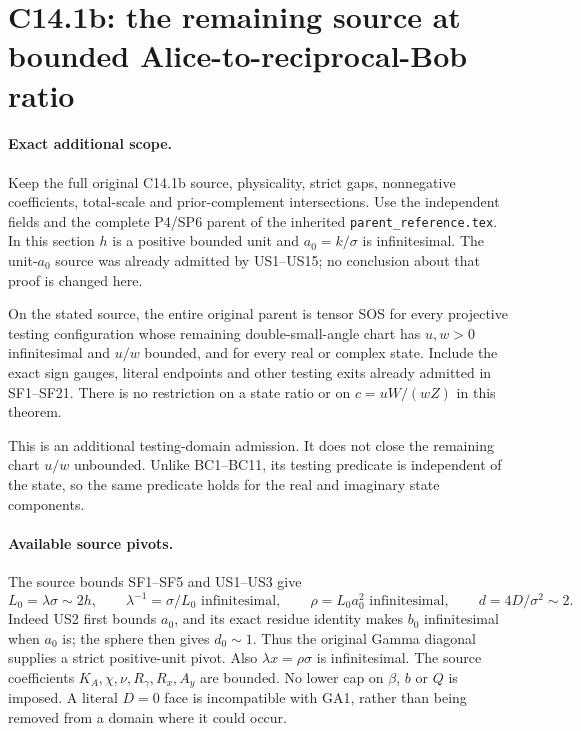 \section{C14.1b: the remaining source at bounded Alice-to-reciprocal-Bob ratio}
\label{sec:c141b-gamma-angular}

\paragraph{Exact additional scope.}
Keep the full original C14.1b source, physicality, strict gaps,
nonnegative coefficients, total-scale and prior-complement
intersections. Use the independent fields and the complete P4/SP6
parent of the inherited \texttt{parent\_reference.tex}. In this
section $h$ is a positive bounded unit and $a_0=k/\sigma$ is
infinitesimal. The unit-$a_0$ source was already admitted by
US1--US15; no conclusion about that proof is changed here.

\begin{theorem}
On the stated source, the entire original parent is tensor SOS
for every projective testing configuration whose remaining
double-small-angle chart has $u,w>0$ infinitesimal and $u/w$
bounded, and for every real or complex state. Include the exact
sign gauges, literal endpoints and other testing exits already
admitted in SF1--SF21. There is no restriction on a state ratio
or on $c=uW/(wZ)$ in this theorem.
\end{theorem}

This is an additional testing-domain admission. It does not close
the remaining chart $u/w$ unbounded. Unlike BC1--BC11, its testing
predicate is independent of the state, so the same predicate holds
for the real and imaginary state components.

\paragraph{Available source pivots.}
The source bounds SF1--SF5 and US1--US3 give
\[
 L_0=\lambda\sigma\sim2h,\qquad
 \lambda^{-1}=\sigma/L_0\text{ infinitesimal},\qquad
 \rho=L_0a_0^2\text{ infinitesimal},\qquad
 d=4D/\sigma^2\sim2.
 \tag{GA1}
\]
Indeed US2 first bounds $a_0$, and its exact residue identity makes
$b_0$ infinitesimal when $a_0$ is; the sphere then gives $d_0\sim1$.
Thus the original Gamma diagonal supplies a strict positive-unit
pivot. Also $\lambda x=\rho\sigma$ is infinitesimal. The source
coefficients $K_A,\chi,\nu,R_\gamma,R_x,A_y$ are bounded. No
lower cap on $\beta$, $b$ or $Q$ is imposed. A literal $D=0$ face
is incompatible with GA1, rather than being removed from a domain
where it could occur.

